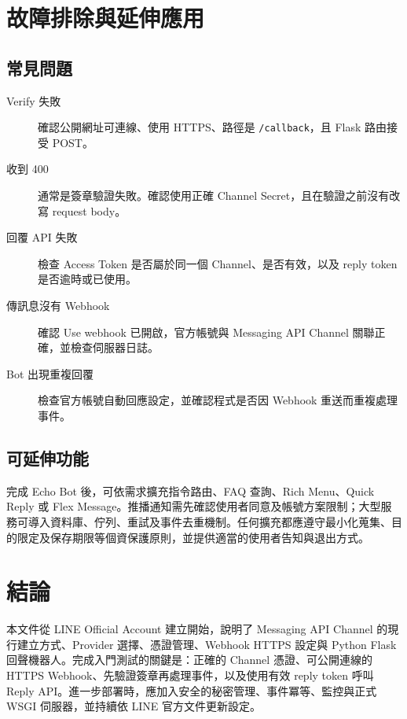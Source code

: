 \documentclass[12pt,a4paper]{report}
\begin{document}
\chapter{故障排除與延伸應用}
\section{常見問題}
\begin{description}
  \item[Verify 失敗] 確認公開網址可連線、使用 HTTPS、路徑是 \texttt{/callback}，且 Flask 路由接受 POST。
  \item[收到 400] 通常是簽章驗證失敗。確認使用正確 Channel Secret，且在驗證之前沒有改寫 request body。
  \item[回覆 API 失敗] 檢查 Access Token 是否屬於同一個 Channel、是否有效，以及 reply token 是否逾時或已使用。
  \item[傳訊息沒有 Webhook] 確認 Use webhook 已開啟，官方帳號與 Messaging API Channel 關聯正確，並檢查伺服器日誌。
  \item[Bot 出現重複回覆] 檢查官方帳號自動回應設定，並確認程式是否因 Webhook 重送而重複處理事件。
\end{description}

\section{可延伸功能}
完成 Echo Bot 後，可依需求擴充指令路由、FAQ 查詢、Rich Menu、Quick Reply 或 Flex Message。推播通知需先確認使用者同意及帳號方案限制；大型服務可導入資料庫、佇列、重試及事件去重機制。任何擴充都應遵守最小化蒐集、目的限定及保存期限等個資保護原則，並提供適當的使用者告知與退出方式。

\chapter{結論}
本文件從 LINE Official Account 建立開始，說明了 Messaging API Channel 的現行建立方式、Provider 選擇、憑證管理、Webhook HTTPS 設定與 Python Flask 回聲機器人。完成入門測試的關鍵是：正確的 Channel 憑證、可公開連線的 HTTPS Webhook、先驗證簽章再處理事件，以及使用有效 reply token 呼叫 Reply API。進一步部署時，應加入安全的秘密管理、事件冪等、監控與正式 WSGI 伺服器，並持續依 LINE 官方文件更新設定。
\end{document}
